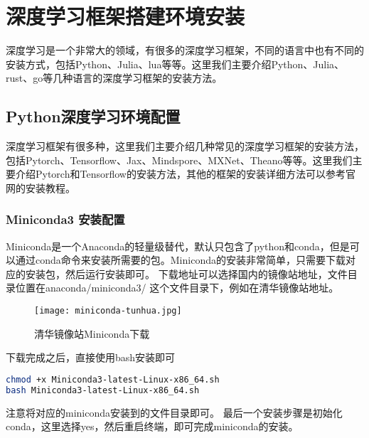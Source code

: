 \documentclass[lang=cn,a4paper,newtx]{elegantpaper}
\begin{document}
\section{深度学习框架搭建环境安装}
深度学习是一个非常大的领域，有很多的深度学习框架，不同的语言中也有不同的安装方式，包括Python、Julia、lua等等。这里我们主要介绍Python、Julia、rust、go等几种语言的深度学习框架的安装方法。
\subsection{Python深度学习环境配置}
深度学习框架有很多种，这里我们主要介绍几种常见的深度学习框架的安装方法，包括Pytorch、Tensorflow、Jax、Mindspore、MXNet、Theano等等。这里我们主要介绍Pytorch和Tensorflow的安装方法，其他的框架的安装详细方法可以参考官网的安装教程。
\subsubsection{Miniconda3 安装配置}
Miniconda是一个Anaconda的轻量级替代，默认只包含了python和conda，但是可以通过conda命令来安装所需要的包。Miniconda的安装非常简单，只需要下载对应的安装包，然后运行安装即可。
下载地址可以选择国内的镜像站地址，文件目录位置在anaconda/miniconda3/ 这个文件目录下，例如在清华镜像站地址。
\begin{figure}[hbpt]
  \centering
  \texttt{[image: miniconda-tunhua.jpg]}
  \caption{清华镜像站Miniconda下载}
  \label{fig:miniconda-tunhua}
\end{figure}

下载完成之后，直接使用bash安装即可
\begin{lstlisting}[language=bash]
chmod +x Miniconda3-latest-Linux-x86_64.sh
bash Miniconda3-latest-Linux-x86_64.sh
\end{lstlisting}
注意将对应的miniconda安装到的文件目录即可。
最后一个安装步骤是初始化conda，这里选择yes，然后重启终端，即可完成miniconda的安装。
\end{document}
